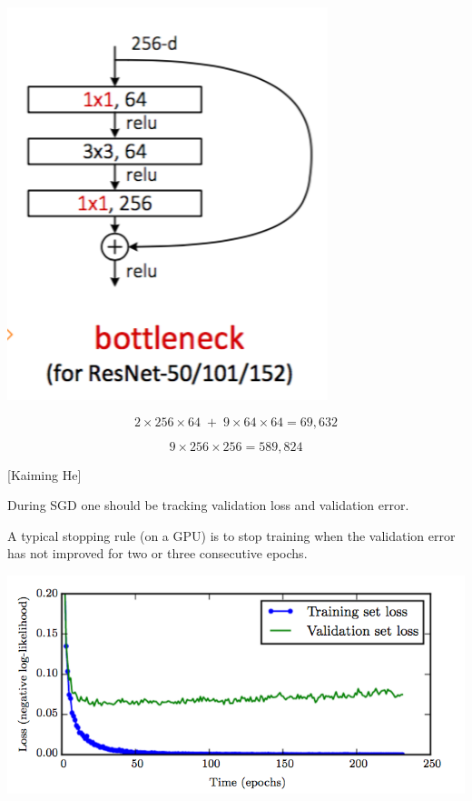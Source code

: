 {\includegraphics[height= 4.5in]{../images/bottleneck} \begin{minipage}[b]{2in}

$$2 \times 256 \times 64 \;+ \;9 \times 64 \times 64 = 69,632$$

  \bigskip
  \bigskip
  $$9 \times 256 \times 256 = 589,824$$
  \bigskip
  \bigskip
    \bigskip
  \bigskip
  \bigskip
  \bigskip
    \bigskip
  \bigskip
\end{minipage}

\centerline{\huge [Kaiming He]}


During SGD one should be tracking validation loss and validation error.

\vfill
A typical stopping rule (on a GPU) is to stop training when the validation error has not improved for two or three consecutive epochs.


\centerline{\includegraphics[width = 8in]{../images/EarlyStopping}}

}
